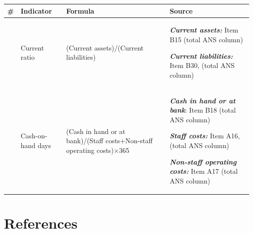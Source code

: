 \documentclass[
  11pt,
  a4paperpaper,
  openany,headsepline=on,footsepline=off,DIV=12,table]{scrbook}
\begin{document}
\begin{longtable}[]{@{}
  >{\raggedright\arraybackslash}p{}
  >{\raggedright\arraybackslash}p{}
  >{\raggedright\arraybackslash}p{}
  >{\raggedright\arraybackslash}p{}@{}}
\toprule\noalign{}
\begin{minipage}[b]{\linewidth}\raggedright
\#
\end{minipage} & \begin{minipage}[b]{\linewidth}\raggedright
Indicator
\end{minipage} & \begin{minipage}[b]{\linewidth}\raggedright
Formula
\end{minipage} & \begin{minipage}[b]{\linewidth}\raggedright
Source
\end{minipage} \\
\midrule\noalign{}
\endhead
\bottomrule\noalign{}
\endlastfoot
1 & Current ratio & (Current assets)/(Current liabilities) &
\textbf{\emph{Current assets:}} Item B15 (total ANS column)

\textbf{\emph{Current liabilities:}} Item B30, (total ANS column) \\
2 & Cash-on-hand days & (Cash in hand or at bank)/(Staff costs+Non-staff
operating costs)×365 & \textbf{\emph{Cash in hand or at bank}}: Item B18
(total ANS column)

\textbf{\emph{Staff costs:}} Item A16, (total ANS column)

\textbf{\emph{Non-staff operating costs:}} Item A17 (total ANS
column) \\
\end{longtable}


\chapter*{References}\label{references}

\end{document}
